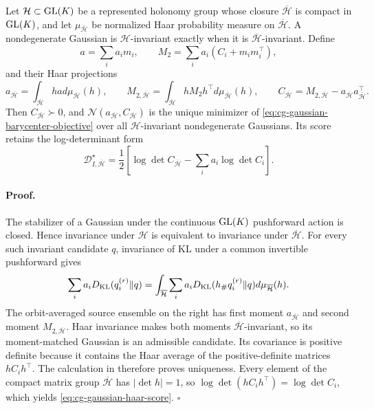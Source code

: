 Let \(\mathcal H\subset\mathrm{GL}(K)\) be a represented holonomy group whose closure
\(\overline{\mathcal H}\) is compact in \(\mathrm{GL}(K)\), and let
\(\mu_{\overline{\mathcal H}}\) be normalized Haar probability measure on
\(\overline{\mathcal H}\). A nondegenerate Gaussian is
\(\mathcal H\)-invariant exactly when it is
\(\overline{\mathcal H}\)-invariant. Define
\begin{equation}
a=\sum_i a_im_i,\qquad
M_2=\sum_i a_i(C_i+m_im_i^\top),
\label{eq:cg-gaussian-raw-moments}
\end{equation}
and their Haar projections
\begin{equation}
a_{\overline{\mathcal H}}
=\int_{\overline{\mathcal H}}ha
d\mu_{\overline{\mathcal H}}(h),\qquad
M_{2,\overline{\mathcal H}}
=\int_{\overline{\mathcal H}}hM_2h^\top
d\mu_{\overline{\mathcal H}}(h),\qquad
C_{\overline{\mathcal H}}
=M_{2,\overline{\mathcal H}}
-a_{\overline{\mathcal H}}a_{\overline{\mathcal H}}^\top.
\label{eq:cg-gaussian-haar-moments}
\end{equation}
Then \(C_{\overline{\mathcal H}}\succ0\), and
\(\mathcal N(a_{\overline{\mathcal H}},C_{\overline{\mathcal H}})\) is the unique minimizer of
\eqref{eq:cg-gaussian-barycenter-objective} over all
\(\mathcal H\)-invariant nondegenerate Gaussians. Its score retains the
log-determinant form
\begin{equation}
\mathcal D_{I,\overline{\mathcal H}}^\star
=\frac12\left[
\log\det C_{\overline{\mathcal H}}-\sum_i a_i\log\det C_i
\right].
\label{eq:cg-gaussian-haar-score}
\end{equation}

\paragraph{Proof.}
The stabilizer of a Gaussian under the continuous \(\mathrm{GL}(K)\) pushforward
action is closed. Hence invariance under \(\mathcal H\) is equivalent to
invariance under \(\overline{\mathcal H}\). For every such invariant
candidate \(q\), invariance of KL under a common invertible pushforward gives
\begin{equation}
\sum_i a_iD_{\mathrm{KL}}(q_i^{(r)}\Vert q)
=\int_{\overline{\mathcal H}}\sum_i a_i
D_{\mathrm{KL}}(h_\#q_i^{(r)}\Vert q)d\mu_{\overline{\mathcal H}}(h).
\label{eq:cg-haar-objective-average}
\end{equation}
The orbit-averaged source ensemble on the right has first moment
\(a_{\overline{\mathcal H}}\) and second moment
\(M_{2,\overline{\mathcal H}}\). Haar invariance makes both moments
\(\overline{\mathcal H}\)-invariant, so its moment-matched Gaussian
is an admissible candidate. Its covariance is positive definite because it
contains the Haar average of the positive-definite matrices \(hC_ih^\top\).
The calculation in
 therefore proves uniqueness.
Every element of the compact matrix group
\(\overline{\mathcal H}\) has \(\lvert\det h\rvert=1\), so
\(\log\det(hC_ih^\top)=\log\det C_i\), which yields
\eqref{eq:cg-gaussian-haar-score}. \(\square\)

